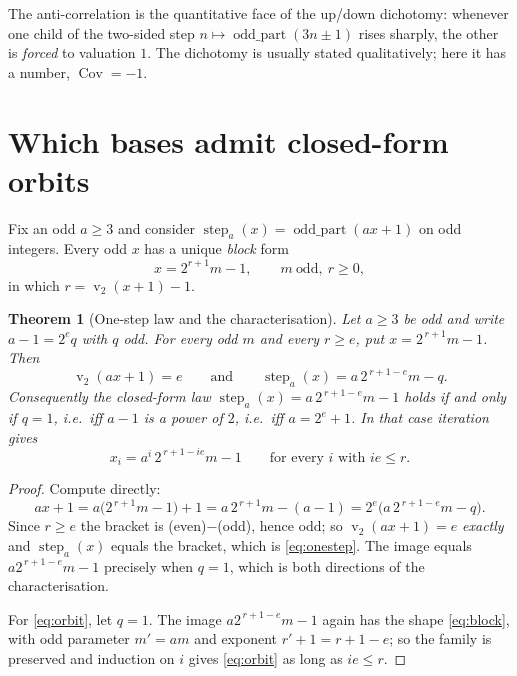 \documentclass[11pt,a4paper]{article}
\theoremstyle{plain}
\newtheorem{theorem}{Theorem}[section]
\theoremstyle{definition}
\newcommand{\val}{\operatorname{v}_2}
\newcommand{\step}{\operatorname{step}}
\begin{document}
\noindent The anti-correlation is the quantitative face of the up/down dichotomy: whenever one
child of the two-sided step $n\mapsto\operatorname{odd\_part}(3n\pm1)$ rises sharply, the other
is \emph{forced} to valuation $1$. The dichotomy is usually stated qualitatively; here it has a
number, $\operatorname{Cov}=-1$.

\section{Which bases admit closed-form orbits}\label{sec:fermat}

Fix an odd $a\ge3$ and consider $\step_{a}(x)=\operatorname{odd\_part}(ax+1)$ on odd integers.
Every odd $x$ has a unique \emph{block} form
\begin{equation}\label{eq:block}
  x=2^{r+1}m-1,\qquad m\ \text{odd},\ r\ge0,
\end{equation}
in which $r=\val(x+1)-1$.

\begin{theorem}[One-step law and the characterisation]\label{thm:fermat}
Let $a\ge3$ be odd and write $a-1=2^{e}q$ with $q$ odd. For every odd $m$ and every $r\ge e$,
put $x=2^{\,r+1}m-1$. Then
\begin{equation}\label{eq:onestep}
  \val(ax+1)=e\qquad\text{and}\qquad \step_{a}(x)=a\,2^{\,r+1-e}m-q .
\end{equation}
Consequently the closed-form law $\step_{a}(x)=a\,2^{\,r+1-e}m-1$ holds \emph{if and only if}
$q=1$, i.e.\ iff $a-1$ is a power of $2$, i.e.\ iff $a=2^{e}+1$. In that case iteration gives
\begin{equation}\label{eq:orbit}
  x_{i}=a^{i}\,2^{\,r+1-ie}m-1\qquad\text{for every }i\text{ with }ie\le r .
\end{equation}
\end{theorem}

\begin{proof}
Compute directly:
\[
  ax+1=a\bigl(2^{\,r+1}m-1\bigr)+1=a\,2^{\,r+1}m-(a-1)
      =2^{e}\bigl(a\,2^{\,r+1-e}m-q\bigr).
\]
Since $r\ge e$ the bracket is (even)$-$(odd), hence odd; so $\val(ax+1)=e$ \emph{exactly} and
$\step_{a}(x)$ equals the bracket, which is \eqref{eq:onestep}. The image equals
$a2^{\,r+1-e}m-1$ precisely when $q=1$, which is both directions of the characterisation.

For \eqref{eq:orbit}, let $q=1$. The image $a2^{\,r+1-e}m-1$ again has the shape
\eqref{eq:block}, with odd parameter $m'=am$ and exponent $r'+1=r+1-e$; so the family is
preserved and induction on $i$ gives \eqref{eq:orbit} as long as $ie\le r$.
\end{proof}
\end{document}
